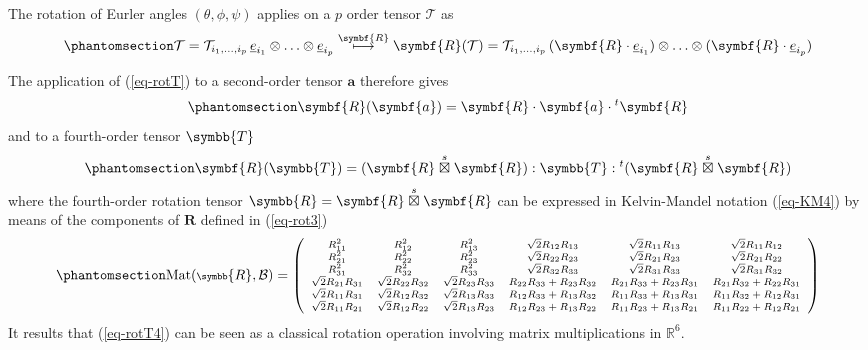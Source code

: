 \documentclass[
  a4paper,
  numbers=noendperiod,
  DIV=12]{scrreprt}
\newcommand{\R}{{\mathbb{{R}}}}
\newcommand{\uu}[1]{{\symbf{{#1}}}}
\newcommand{\uuuu}[1]{{\symbb{{#1}}}}
\newcommand{\uv}[1]{{\underline{{#1}}}}
\newcommand{\ve}[1]{{\uv{{e}}_{{#1}}}}
\newcommand{\trans}[1]{{{}^{t}{#1}}}
\newcommand{\sboxtimes}{\stackrel{s}{\boxtimes}}
\DeclareMathOperator{\Mat}{Mat}
\begin{document}
The rotation of Eurler angles \((\theta,\phi,\psi)\) applies on a \(p\)
order tensor \(\mathcal{T}\) as
\begin{equation}\phantomsection\label{eq-rotT}{
\mathcal{T}=
\mathcal{T}_{i_1,\ldots,i_p} \,\ve{i_1}\otimes\ldots\otimes\ve{i_{p}}
\overset{\uu{R}}{\longmapsto}
\uu{R}(\mathcal{T})=
\mathcal{T}_{i_1,\ldots,i_p} \,(\uu{R}\cdot\ve{i_1})\otimes\ldots\otimes(\uu{R}\cdot\ve{i_{p}})
}\end{equation}

The application of (\ref{eq-rotT}) to a second-order tensor \(\uu{a}\)
therefore gives \begin{equation}\phantomsection\label{eq-rotT2}{
\uu{R}(\uu{a})=\uu{R}\cdot 
\uu{a}
\cdot\trans{\uu{R}}
}\end{equation} and to a fourth-order tensor \(\uuuu{T}\)
\begin{equation}\phantomsection\label{eq-rotT4}{
\uu{R}(\uuuu{T})=(\uu{R}\sboxtimes\uu{R}):
\uuuu{T}
:\trans{(\uu{R}\sboxtimes\uu{R})}
}\end{equation} where the fourth-order rotation tensor
\(\uuuu{R}=\uu{R}\sboxtimes\uu{R}\) can be expressed in Kelvin-Mandel
notation (\ref{eq-KM4}) by means of the components of \(\uu{R}\) defined
in (\ref{eq-rot3}) \begin{equation}\phantomsection\label{eq-rot6}{
\scriptsize
\Mat(\uuuu{R},\mathcal{B})=
   \left(
\begin{array}{cccccc}
R_{1 1}^{2} & R_{1 2}^{2} & R_{1 3}^{2} & \sqrt{2}  R_{1 2}  R_{1 3} & \sqrt{2}  R_{1 1}  R_{1 3} & \sqrt{2}  R_{1 1}  R_{1 2} \\
R_{2 1}^{2} & R_{2 2}^{2} & R_{2 3}^{2} & \sqrt{2}  R_{2 2}  R_{2 3} & \sqrt{2}  R_{2 1}  R_{2 3} & \sqrt{2}  R_{2 1}  R_{2 2} \\
R_{3 1}^{2} & R_{3 2}^{2} & R_{3 3}^{2} & \sqrt{2}  R_{3 2}  R_{3 3} & \sqrt{2}  R_{3 1}  R_{3 3} & \sqrt{2}  R_{3 1}  R_{3 2} \\
\sqrt{2}  R_{2 1}  R_{3 1} & \sqrt{2}  R_{2 2}  R_{3 2} & \sqrt{2}  R_{2 3}  R_{3 3} & R_{2 2}  R_{3 3} + R_{2 3}  R_{3 2} & R_{2 1}  R_{3 3} + R_{2 3}  R_{3 1} & R_{2 1}  R_{3 2} + R_{2 2}  R_{3 1} \\
\sqrt{2}  R_{1 1}  R_{3 1} & \sqrt{2}  R_{1 2}  R_{3 2} & \sqrt{2}  R_{1 3}  R_{3 3} & R_{1 2}  R_{3 3} + R_{1 3}  R_{3 2} & R_{1 1}  R_{3 3} + R_{1 3}  R_{3 1} & R_{1 1}  R_{3 2} + R_{1 2}  R_{3 1} \\
\sqrt{2}  R_{1 1}  R_{2 1} & \sqrt{2}  R_{1 2}  R_{2 2} & \sqrt{2}  R_{1 3}  R_{2 3} & R_{1 2}  R_{2 3} + R_{1 3}  R_{2 2} & R_{1 1}  R_{2 3} + R_{1 3}  R_{2 1} & R_{1 1}  R_{2 2} + R_{1 2}  R_{2 1} \\
\end{array}
\right)
}\end{equation} It results that (\ref{eq-rotT4}) can be seen as a
classical rotation operation involving matrix multiplications in
\(\R^6\).
\end{document}
